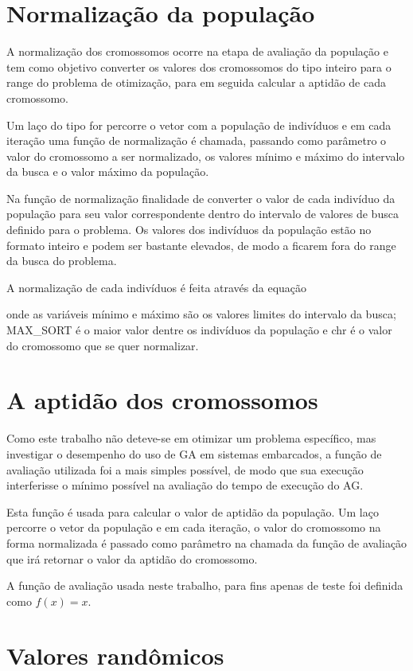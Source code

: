 \documentclass[
    12pt,               %
    oneside,%
    a4paper,            %
    english,            %
    french,             %
    spanish,            %
    brazil,             %
    ]{abntex2}
\begin{document}
\section{Normalização da população}

  A normalização dos cromossomos ocorre na etapa de avaliação da população e tem como objetivo converter os valores dos cromossomos do tipo inteiro para o range do problema de otimização, para em seguida calcular a aptidão de cada cromossomo.

  Um laço do tipo for percorre o vetor com a população de indivíduos e em cada iteração uma função  de normalização é chamada, passando como parâmetro o valor do cromossomo a ser normalizado, os valores mínimo e máximo do intervalo da busca e o valor máximo da população.
  
  Na função de normalização finalidade de converter o valor de cada indivíduo da população para seu valor correspondente dentro do intervalo de valores de busca definido para o problema.  Os valores dos indivíduos da população estão no formato inteiro e podem ser bastante elevados, de modo a ficarem fora do range da busca do problema.

 A normalização  de cada indivíduos é feita  através da equação 
 

 onde as variáveis mínimo e máximo são os valores limites do intervalo da busca; MAX\_SORT é o maior valor dentre os indivíduos da população e chr é o valor do cromossomo que se quer normalizar.

\section{A aptidão dos cromossomos}

  Como este trabalho não deteve-se em otimizar um problema específico, mas investigar o desempenho do uso de GA em sistemas embarcados, a função de avaliação utilizada foi a mais simples possível, de modo que sua execução interferisse o mínimo possível na avaliação do tempo de execução do AG.

  Esta função é usada para calcular o valor de aptidão da população. Um laço percorre o vetor da população e em cada iteração, o valor do cromossomo na forma normalizada é passado como parâmetro na chamada da função de avaliação que irá retornar o valor da aptidão do cromossomo.

  A função de avaliação usada neste trabalho, para fins apenas de teste foi definida como $f(x) = x$.

\section{Valores randômicos}
\end{document}
